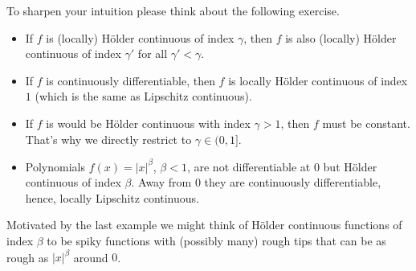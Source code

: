 	To sharpen your intuition please think about the following exercise.
\begin{luebung}
	\begin{itemize}
		\item If $f$ is (locally) H\"older continuous of index $\gamma$, then $f$ is also (locally) H\"older continuous of index $\gamma'$ for all $\gamma'<\gamma$.
		\item If $f$ is continuously differentiable, then $f$ is locally H\"older continuous of index $1$ (which is the same as Lipschitz continuous).
		\item If $f$ is would be H\"older continuous with index $\gamma>1$, then $f$ must be constant. That's why we directly restrict to $\gamma\in (0,1]$.
		\item Polynomials $f(x)=|x|^\beta$, $\beta<1$, are not differentiable at $0$ but H\"older continuous of index $\beta$. Away from $0$ they are continuously differentiable, hence, locally Lipschitz continuous.
	\end{itemize}
\end{luebung}
Motivated by the last example we might think of H\"older continuous functions of index $\beta$ to be spiky functions with (possibly many) rough tips that can be as rough as $|x|^\beta$ around $0$.\smallskip

